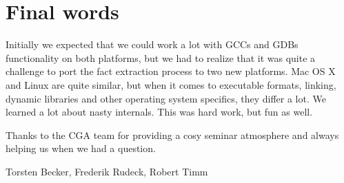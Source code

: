 
\section{Final words} Initially we expected that we could work a lot with GCCs and GDBs functionality on both platforms, but we had to realize that it was quite a challenge to port the fact extraction process to two new platforms.  Mac OS X and Linux are quite similar, but when it comes to executable formats, linking, dynamic libraries and other operating system specifics, they differ a lot. We learned a lot about nasty internals. This was hard work, but fun as well. 

Thanks to the CGA team for providing a cosy seminar atmosphere and always helping us when we had a question.

Torsten Becker, Frederik Rudeck, Robert Timm 
